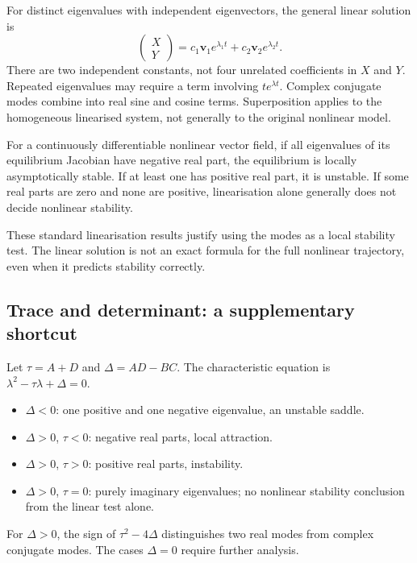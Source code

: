 For distinct eigenvalues with independent eigenvectors, the general linear
solution is
\[
\begin{pmatrix}X\\Y\end{pmatrix}
=c_1\mathbf v_1e^{\lambda_1t}+c_2\mathbf v_2e^{\lambda_2t}.
\]
There are two independent constants, not four unrelated coefficients in
$X$ and $Y$. Repeated eigenvalues may require a term involving $te^{\lambda t}$.
Complex conjugate modes combine into real sine and cosine terms.
Superposition applies to the homogeneous linearised system, not generally
to the original nonlinear model.

\begin{proposition}
For a continuously differentiable nonlinear vector field, if all eigenvalues
of its equilibrium Jacobian have negative real part, the equilibrium is
locally asymptotically stable. If at least one has positive real part,
it is unstable. If some real parts are zero and none are positive,
linearisation alone generally does not decide nonlinear stability.
\end{proposition}
These standard linearisation results justify using the modes as a local
stability test. The linear solution is not an exact formula for the full
nonlinear trajectory, even when it predicts stability correctly.

\subsection{Trace and determinant: a supplementary shortcut}
Let $\tau=A+D$ and $\Delta=AD-BC$. The characteristic equation is
$\lambda^2-\tau\lambda+\Delta=0$.
\begin{itemize}
\item $\Delta<0$: one positive and one negative eigenvalue, an unstable saddle.
\item $\Delta>0$, $\tau<0$: negative real parts, local attraction.
\item $\Delta>0$, $\tau>0$: positive real parts, instability.
\item $\Delta>0$, $\tau=0$: purely imaginary eigenvalues; no nonlinear
stability conclusion from the linear test alone.
\end{itemize}
For $\Delta>0$, the sign of $\tau^2-4\Delta$ distinguishes two real modes
from complex conjugate modes. The cases $\Delta=0$ require further analysis.

